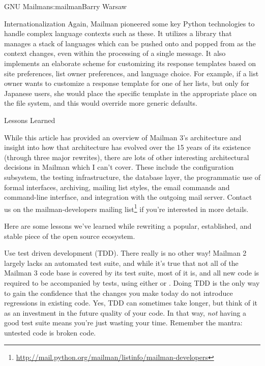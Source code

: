 \begin{aosachapter}{GNU Mailman}{s:mailman}{Barry Warsaw}
\begin{aosasect1}{Internationalization}
Again, Mailman pioneered some key Python technologies to handle
complex language contexts such as these.  It utilizes a library that
manages a stack of languages which can be pushed onto and popped from
as the context changes, even within the processing of a single
message.  It also implements an elaborate scheme for customizing its
response templates based on site preferences, list owner preferences,
and language choice.  For example, if a list owner wants to customize
a response template for one of her lists, but only for Japanese users,
she would place the specific template in the appropriate place on the
file system, and this would override more generic defaults.

\end{aosasect1}

\begin{aosasect1}{Lessons Learned}

While this article has provided an overview of Mailman 3's
architecture and insight into how that architecture has evolved over
the 15 years of its existence (through three major rewrites), there
are lots of other interesting architectural decisions in Mailman which
I can't cover.  These include the configuration subsystem, the testing
infrastructure, the database layer, the programmatic use of formal
interfaces, archiving, mailing list styles, the email commands and
command-line interface, and integration with the outgoing mail server.
Contact us on the mailman-developers mailing
list\footnote{\url{http://mail.python.org/mailman/listinfo/mailman-developers}}
if you're interested in more details.

Here are some lessons we've learned while rewriting a popular,
established, and stable piece of the open source ecosystem.

\begin{aosaitemize}

\item Use test driven development (TDD).  There really is no other
  way!  Mailman 2 largely lacks an automated test suite, and while
  it's true that not all of the Mailman 3 code base is covered by its
  test suite, most of it is, and all new code is required to be
  accompanied by tests, using either  or
  .  Doing TDD is the only way to gain the confidence
  that the changes you make today do not introduce regressions in
  existing code.  Yes, TDD can sometimes take longer, but think of it
  as an investment in the future quality of your code.  In that way,
  \emph{not} having a good test suite means you're just wasting your
  time.  Remember the mantra: untested code is broken code.


\end{aosaitemize}
\end{aosasect1}
\end{aosachapter}
